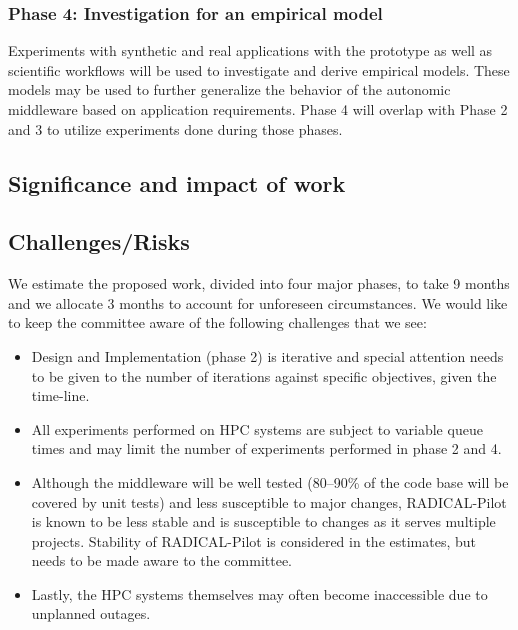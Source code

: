\subsubsection{Phase 4: Investigation for an empirical model}

Experiments with synthetic and real applications with the prototype as well as scientific workflows will be used to investigate and derive empirical models. These models may be used to further generalize the behavior of the autonomic middleware based on application requirements. Phase 4 will overlap with Phase 2 and 3 to utilize experiments done during those phases.

\subsection{Significance and impact of work}


\subsection{Challenges/Risks}

We estimate the proposed work, divided into four major phases, to take 9 months and we allocate 3 months to account for unforeseen circumstances. We would like to keep the committee aware of the following challenges that we see:

\begin{itemize}
	\item Design and Implementation (phase 2) is iterative and special attention needs to be given to the number of iterations against specific objectives, given the time-line.
    \item All experiments performed on HPC systems are subject to variable queue times and may limit the number of experiments performed in phase 2 and 4.
	\item Although the middleware will be well tested (80--90\% of the code base will be covered by unit tests) and less susceptible to major changes, RADICAL-Pilot is known to be less stable and is susceptible to changes as it serves multiple projects. Stability of RADICAL-Pilot is considered in the estimates, but needs to be made aware to the committee.
	\item Lastly, the HPC systems themselves may often become inaccessible due to unplanned outages.
\end{itemize}



